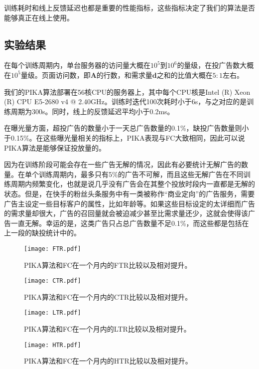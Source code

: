 训练耗时和线上反馈延迟也都是重要的性能指标，这些指标决定了我们的算法是否能够真正在线上使用。

\subsection{实验结果}

在每个训练周期内，单台服务器的访问量大概在$10^5$到$10^6$的量级，在投广告数大概在$10^5$量级。页面访问数，即$\bm{A}$的行数，和需求量$\bm{d}$之和的比值大概在$5:1$左右。

我们的PIKA算法部署在56核CPU的服务器上，其中每个CPU核是Intel (R) Xeon (R) CPU E5-2680 v4 @ 2.40GHz。训练时迭代100次耗时小于6s，与之对应的是训练周期为300s。同时，线上的反馈延迟平均小于0.2ms。

在曝光量方面，超投广告的数量小于一天总广告数量的0.1\%，缺投广告数量则小于0.15\%。在这些曝光量相关的指标上，PIKA表现与FC大致相同，因此可以说PIKA算法是能够保证投放量的。

因为在训练阶段可能会存在一些广告无解的情况，因此有必要统计无解广告的数量。在单个训练周期内，最多只有5\%的广告不可解，而且这些无解广告在不同训练周期内频繁变化，也就是说几乎没有广告会在其整个投放时段内一直都是无解的状态。但是，在快手的粉丝头条服务中有一类被称作“商业定向”的广告服务，需要广告主设定一些目标客户的属性，比如年龄等。如果这些目标设定的太详细而广告的需求量却很大，广告的召回量就会被迫减少甚至比需求量还少，这就会使得该广告一直无解。幸运的是，这类广告只占总广告数量不足0.1\%，而这些都是包括在上一段的缺投统计中的。

\begin{figure}[htb]
	\centering
	\texttt{[image: FTR.pdf]}
	\caption{PIKA算法和FC在一个月内的FTR比较以及相对提升。}
	\label{fig:FTR}
\end{figure}

\begin{figure}[htb]
	\centering
	\texttt{[image: CTR.pdf]}
	\caption{PIKA算法和FC在一个月内的CTR比较以及相对提升。}
	\label{fig:CTR}
\end{figure}

\begin{figure}[htb]
	\centering
	\texttt{[image: LTR.pdf]}
	\caption{PIKA算法和FC在一个月内的LTR比较以及相对提升。}
	\label{fig:LTR}
\end{figure}

\begin{figure}[htb]
	\centering
	\texttt{[image: HTR.pdf]}
	\caption{PIKA算法和FC在一个月内的HTR比较以及相对提升。}
	\label{fig:HTR}
\end{figure}

